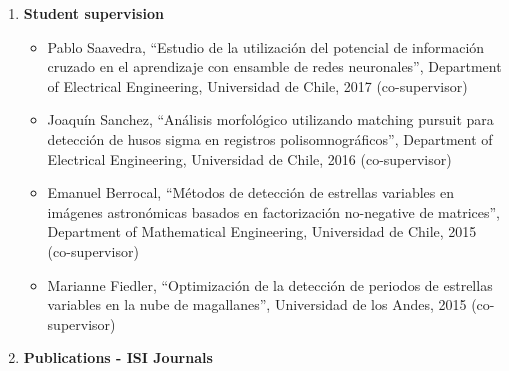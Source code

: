 \documentclass[letterpaper,11pt]{article}
\newcommand{\compactlist}{\setlength{\parskip}{0pt} \setlength{\leftskip}{2em}}
\begin{document}
\begin{enumerate}[I]
\begin{itemize}
    	\end{itemize}
        
    \item \textbf{Student supervision}
    \begin{itemize}  \compactlist{}
        \item Pablo Saavedra, ``Estudio de la utilizaci\'on del potencial de informaci\'on cruzado en el aprendizaje con ensamble de redes neuronales'', Department of Electrical Engineering, Universidad de Chile, 2017 (co-supervisor)
        \item Joaqu\'in Sanchez, ``An\'alisis morfol\'ogico utilizando matching pursuit para detecci\'on de husos sigma en registros polisomnogr\'aficos'', Department of Electrical Engineering, Universidad de Chile, 2016 (co-supervisor)
		\item Emanuel Berrocal, ``M\'etodos de detecci\'on de estrellas variables en im\'agenes astron\'omicas basados en factorizaci\'on no-negative de matrices'', Department of Mathematical Engineering, Universidad de Chile, 2015 (co-supervisor)
        \item Marianne Fiedler, ``Optimizaci\'on de la detecci\'on de periodos de estrellas variables en la nube de magallanes'', Universidad de los Andes, 2015 (co-supervisor)
		
		\end{itemize}
	
	
	
	\item \textbf{Publications - ISI Journals}


\end{enumerate}
\end{document}
